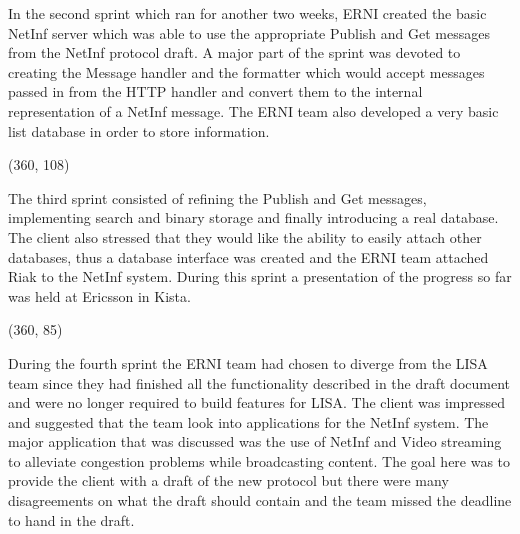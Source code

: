 In the second sprint which ran for another two weeks, ERNI created the basic NetInf server which was able to use the appropriate Publish and Get messages from the NetInf protocol draft. A major part of the sprint was devoted to creating the Message handler and the formatter which would accept messages passed in from the HTTP handler and convert them to the internal representation of a NetInf message. The ERNI team also developed a very basic list database in order to store information. 


\framebox(360, 108){
}

The third sprint consisted of refining the Publish and Get messages, implementing search and binary storage and finally introducing a real database. The client also stressed that they would like the ability to easily attach other databases, thus a database interface was created and the ERNI team attached Riak to the NetInf system. During this sprint a presentation of the progress so far was held at Ericsson in Kista.

\framebox(360, 85){
}

During the fourth sprint the ERNI team had chosen to diverge from the LISA team since they had finished all the functionality described in the draft document and were no longer required to build features for LISA. The client was impressed and suggested that the team look into applications for the NetInf system. The major application that was discussed was the use of NetInf and Video streaming to alleviate congestion problems while broadcasting content. The goal here was to provide the client with a draft of the new protocol but there were many disagreements on what the draft should contain and the team missed the deadline to hand in the draft.

